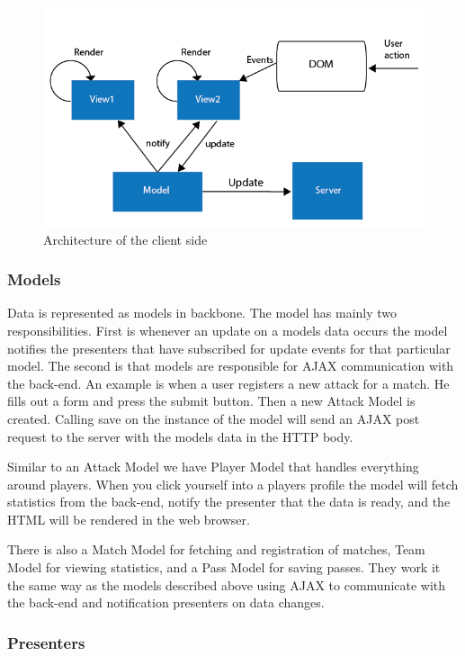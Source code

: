 \begin{figure}[ht!]
\centering
\includegraphics[width=1\textwidth]{images/architecture/backbone_architecture.png}
\caption{Architecture of the client side}
\label{overflow}
\end{figure}

\subsubsection{Models}

Data is represented as models in backbone. The model has mainly two responsibilities. First is whenever an update on a models data occurs the model notifies the presenters that have subscribed for update events for that particular model. The second is that models are responsible for \ac{AJAX} communication with the back-end. An example is when a user registers a new attack for a match. He fills out a form and press the submit button. Then a new Attack Model is created. Calling save on the instance of the model will send an \ac{AJAX} post request to the server with the models data in the \ac{HTTP} body.

Similar to an Attack Model we have Player Model that handles everything around players. When you click yourself into a players profile the model will fetch statistics from the back-end, notify the presenter that the data is ready, and the \ac{HTML} will be rendered in the web browser.

There is also a Match Model for fetching and registration of matches, Team Model for viewing statistics, and a Pass Model for saving passes. They work it the same way as the models described above using \ac{AJAX} to communicate with the back-end and notification presenters on data changes.

\subsubsection{Presenters}

